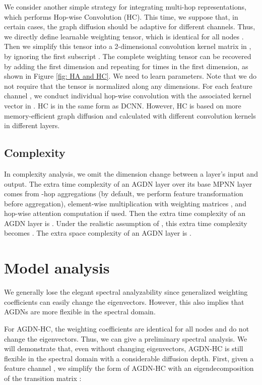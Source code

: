 \documentclass{article}
\begin{document}
We consider another simple strategy for integrating multi-hop representations, which performs Hop-wise Convolution (HC). This time, we suppose that, in certain cases, the graph diffusion should be adaptive for different channels. Thus, we directly define learnable weighting tensor, which is identical for all nodes . Then we simplify this tensor into a 2-dimensional convolution kernel matrix  in , by ignoring the first subscript . The complete weighting tensor  can be recovered by adding the first dimension and repeating  for  times in the first dimension, as shown in Figure \ref{fig: HA and HC}. We need to learn  parameters. Note that we do not require that the tensor is normalized along any dimensions. For each feature channel , we conduct individual hop-wise convolution with the associated kernel vector in . HC is in the same form as DCNN. However, HC is based on more memory-efficient graph diffusion and calculated with different convolution kernels in different layers.













\subsection{Complexity}
In complexity analysis, we omit the dimension change between a layer's input and output. The extra time complexity of an AGDN layer over its base MPNN layer comes from -hop aggregations  (by default, we perform feature transformation before aggregation), element-wise multiplication with weighting matrices , and hop-wise attention computation  if used. Then the extra time complexity of an AGDN layer is . Under the realistic assumption of , this extra time complexity becomes .
The extra space complexity of an AGDN layer is .








\section{Model analysis}
We generally lose the elegant spectral analyzability since generalized weighting coefficients can easily change the eigenvectors. However, this also implies that AGDNs are more flexible in the spectral domain. 


For AGDN-HC, the weighting coefficients are identical for all nodes and do not change the eigenvectors. Thus, we can give a preliminary spectral analysis. We will demonstrate that, even without changing eigenvectors, AGDN-HC is still flexible in the spectral domain with a considerable diffusion depth. First, given a feature channel , we simplify the form of AGDN-HC with an eigendecomposition of the transition matrix :
\end{document}
